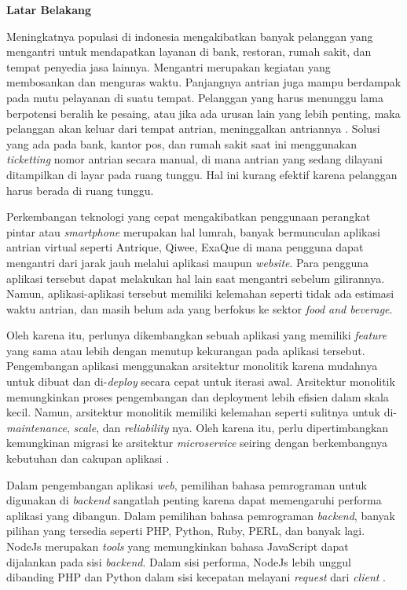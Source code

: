\noindent\textbf{Latar Belakang}

Meningkatnya populasi di indonesia mengakibatkan banyak pelanggan yang mengantri untuk mendapatkan layanan di bank, restoran, rumah sakit, dan tempat penyedia jasa lainnya. Mengantri merupakan kegiatan yang membosankan dan menguras waktu. Panjangnya antrian juga mampu berdampak pada mutu pelayanan di suatu tempat. Pelanggan yang harus menunggu lama berpotensi beralih ke pesaing, atau jika ada urusan lain yang lebih penting, maka pelanggan akan keluar dari tempat antrian, meninggalkan antriannya \cite{khong2017queue}\cite{Ghazal2016}\cite{Uddin2016}. Solusi yang ada pada bank, kantor pos, dan rumah sakit saat ini menggunakan \textit{ticketting} nomor antrian secara manual, di mana antrian yang sedang dilayani ditampilkan di layar pada ruang tunggu. Hal ini kurang efektif karena pelanggan harus berada di ruang tunggu\cite{Ghazal2016}.

Perkembangan teknologi yang cepat mengakibatkan penggunaan perangkat pintar atau \textit{smartphone} merupakan hal lumrah, banyak bermunculan aplikasi antrian virtual seperti Antrique, Qiwee, ExaQue di mana pengguna dapat mengantri dari jarak jauh melalui aplikasi maupun \textit{website}. Para pengguna aplikasi tersebut dapat melakukan hal lain saat mengantri sebelum gilirannya. Namun, aplikasi-aplikasi tersebut memiliki kelemahan seperti tidak ada estimasi waktu antrian, dan masih belum ada yang berfokus ke sektor \textit{food and beverage}.

Oleh karena itu, perlunya dikembangkan sebuah aplikasi yang memiliki \textit{feature} yang sama atau lebih dengan menutup kekurangan pada aplikasi tersebut. Pengembangan aplikasi menggunakan arsitektur monolitik karena mudahnya untuk dibuat dan di-\textit{deploy} secara cepat untuk iterasi awal. Arsitektur monolitik memungkinkan proses pengembangan dan deployment lebih efisien dalam skala kecil. Namun, arsitektur monolitik memiliki kelemahan seperti sulitnya untuk di-\textit{maintenance}, \textit{scale}, dan \textit{reliability} nya. Oleh karena itu, perlu dipertimbangkan kemungkinan migrasi ke arsitektur \textit{microservice} seiring dengan berkembangnya kebutuhan dan cakupan aplikasi \cite{gos2020comparison} \cite{jatkiewicz2023differences}.

Dalam pengembangan aplikasi \textit{web}, pemilihan bahasa pemrograman untuk digunakan di \textit{backend} sangatlah penting karena dapat memengaruhi performa aplikasi yang dibangun. Dalam pemilihan bahasa pemrograman \textit{backend}, banyak pilihan yang tersedia seperti PHP, Python, Ruby, PERL, dan banyak lagi. NodeJs merupakan \textit{tools} yang memungkinkan bahasa JavaScript dapat dijalankan pada sisi \textit{backend}. Dalam sisi performa, NodeJs lebih unggul dibanding PHP dan Python dalam sisi kecepatan melayani \textit{request} dari \textit{client} \cite{William2020} \cite{Odeniran2023}.

